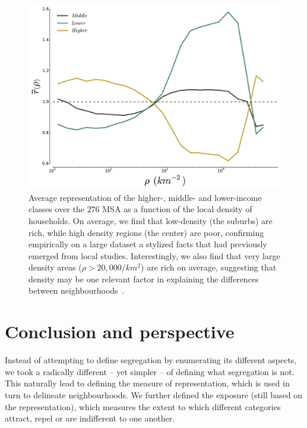 \begin{figure}
    \centering
    \includegraphics[width=\textwidth]{gfx/chapter-segregation/figure4.pdf}
    \caption{Average representation of the higher-, middle- and
      lower-income classes over the $276$ MSA as a function of the
      local density of households. On average, we find that low-density (the
  suburbs) are rich, while high density regions (the center) are poor,
  confirming empirically on a large dataset a stylized facts that had previously
  emerged from local studies. Interestingly, we also
  find that  very large density areas ($\rho>20,000/km^2$) are rich on average,
  suggesting that density may be one relevant factor in explaining the
  differences between neighbourhoods~\cite{Jacobs:1961}.
  \label{fig:high_low_densities}} 
  \end{figure}

\section{Conclusion and perspective}
\label{sec:conclusion_and_perspective}

Instead of attempting to define segregation by enumerating its different aspects, we took
a radically different -- yet simpler -- of defining what segregation is not.
This naturally lead to defining the measure of representation, which is used in
turn to delineate neighbourhoods. We further defined the exposure (still based
on the representation), which measures the extent to which different categories
attract, repel or are indifferent to one another.


